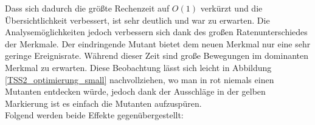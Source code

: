 \documentclass[11pt, a4paper, german]{article}
\theoremstyle{plain}
\begin{document}
	Dass sich dadurch die größte Rechenzeit auf $ O(1) $ verkürzt und die Über\-sichtlichkeit verbessert, ist sehr deutlich und war zu erwarten. Die Analysemöglichkeiten jedoch verbessern sich dank des großen Ratenunterschiedes der Merkmale. Der eindringende Mutant bietet dem neuen Merkmal nur eine sehr geringe Ereignisrate. Während dieser Zeit sind große Bewegungen im dominanten Merkmal zu erwarten. Diese Beobachtung lässt sich leicht in Abbildung \ref{TSS2_optimierung_small} nachvollziehen, wo man in rot niemals einen Mutanten entdecken würde, jedoch dank der Ausschläge in der gelben Markierung ist es einfach die Mutanten aufzuspüren.\\
	Folgend werden beide Effekte gegenübergestellt:\\
	\begin{center}
	\begin{minipage}{1\textwidth}
	\begin{minipage}{0.25\textwidth}

\end{minipage}
\end{minipage}
\end{center}
\end{document}
